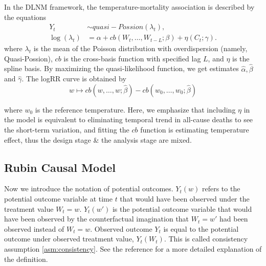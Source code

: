 \documentclass[12pt]{article}
\begin{document}
In the DLNM framework,
the temperature-mortality association is described by the equations
\begin{equation}
	\begin{split}
		Y_t &\sim quasi-Possion(\lambda_t), \\
		\log(\lambda_t) &= \alpha + cb(W_t, \dots, W_{t-L};\beta) + \eta(C_t; \gamma).
	\end{split}
	\label{eqn:dlnm}
\end{equation}
where $\lambda_t$ is the mean of 
the Poisson distribution with overdispersion (namely, Quasi-Possion\cite{quasipoisson}),
$cb$ is the cross-basis function with specified lag $L$,
and $\eta$ is the spline basis.
By maximizing the quasi-likelihood function, 
we get estimates $\hat{\alpha}, \hat{\beta}$ and $\hat{\gamma}$.
The logRR curve is obtained by
\begin{equation}
	w\mapsto cb(w, \dots, w;\hat{\beta}) - cb(w_0, \dots, w_0; \hat{\beta})
	\label{eqn:dlnmlogrr}
\end{equation}
	
where $w_0$ is the reference temperature.
Here, we emphasize that 
including $\eta$ in the model is equivalent to eliminating temporal trend in all-cause deaths
to see the short-term variation,
and fitting the $cb$ function is estimating temperature effect,
thus the design stage \& the analysis stage are mixed.


\subsection{Rubin Causal Model}
\label{section:rcm}

Now we introduce the notation of potential outcomes.
$Y_t(w)$ refers to the potential outcome variable at time $t$
that would have been observed under the treatment value $W_t = w$.
$Y_t(w')$ is the potential outcome variable 
that would have been observed by the counterfactual imagination
that $W_t = w'$ had been observed instead of $W_t = w$.
Observed outcome $Y_t$ is equal to the potential outcome under observed treatment value, $Y_t(W_t)$.
This is called consistency assumption \ref{asm:consistency}.
See the reference\cite{whatif2020} for a more detailed explanation of the definition.
\end{document}
